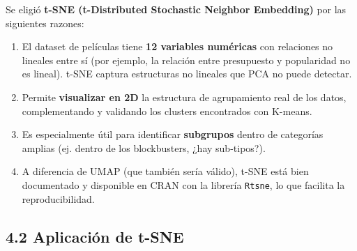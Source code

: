 \documentclass[
]{article}
\providecommand{\tightlist}{%
  \setlength{\itemsep}{0pt}\setlength{\parskip}{0pt}}
\begin{document}
Se eligió \textbf{t-SNE (t-Distributed Stochastic Neighbor Embedding)}
por las siguientes razones:

\begin{enumerate}
\def\labelenumi{\arabic{enumi}.}
\tightlist
\item
  El dataset de películas tiene \textbf{12 variables numéricas} con
  relaciones no lineales entre sí (por ejemplo, la relación entre
  presupuesto y popularidad no es lineal). t-SNE captura estructuras no
  lineales que PCA no puede detectar.\\
\item
  Permite \textbf{visualizar en 2D} la estructura de agrupamiento real
  de los datos, complementando y validando los clusters encontrados con
  K-means.\\
\item
  Es especialmente útil para identificar \textbf{subgrupos} dentro de
  categorías amplias (ej. dentro de los blockbusters, ¿hay
  sub-tipos?).\\
\item
  A diferencia de UMAP (que también sería válido), t-SNE está bien
  documentado y disponible en CRAN con la librería \texttt{Rtsne}, lo
  que facilita la reproducibilidad.
\end{enumerate}

\subsection{4.2 Aplicación de t-SNE}\label{aplicaciuxf3n-de-t-sne}
\end{document}
